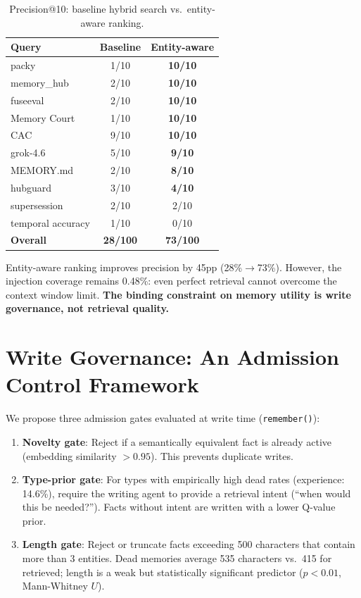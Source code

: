 \documentclass[11pt]{article}
\begin{document}
\begin{table}[h]
\centering
\caption{Precision@10: baseline hybrid search vs.\ entity-aware ranking.}
\label{tab:retrieval}
\begin{tabular}{lcc}
\toprule
Query & Baseline & Entity-aware \\
\midrule
packy & 1/10 & \textbf{10/10} \\
memory\_hub & 2/10 & \textbf{10/10} \\
fuseeval & 2/10 & \textbf{10/10} \\
Memory Court & 1/10 & \textbf{10/10} \\
CAC & 9/10 & \textbf{10/10} \\
grok-4.6 & 5/10 & \textbf{9/10} \\
MEMORY.md & 2/10 & \textbf{8/10} \\
hubguard & 3/10 & \textbf{4/10} \\
supersession & 2/10 & 2/10 \\
temporal accuracy & 1/10 & 0/10 \\
\midrule
\textbf{Overall} & \textbf{28/100} & \textbf{73/100} \\
\bottomrule
\end{tabular}
\end{table}

Entity-aware ranking improves precision by 45pp (28\%$\to$73\%). However, the injection coverage remains 0.48\%: even perfect retrieval cannot overcome the context window limit. \textbf{The binding constraint on memory utility is write governance, not retrieval quality.}

\section{Write Governance: An Admission Control Framework}

We propose three admission gates evaluated at write time (\texttt{remember()}):

\begin{enumerate}
\item \textbf{Novelty gate}: Reject if a semantically equivalent fact is already active (embedding similarity $> 0.95$). This prevents duplicate writes.
\item \textbf{Type-prior gate}: For types with empirically high dead rates (experience: 14.6\%), require the writing agent to provide a retrieval intent (``when would this be needed?''). Facts without intent are written with a lower Q-value prior.
\item \textbf{Length gate}: Reject or truncate facts exceeding 500 characters that contain more than 3 entities. Dead memories average 535 characters vs.\ 415 for retrieved; length is a weak but statistically significant predictor ($p < 0.01$, Mann-Whitney $U$).
\end{enumerate}
\end{document}
